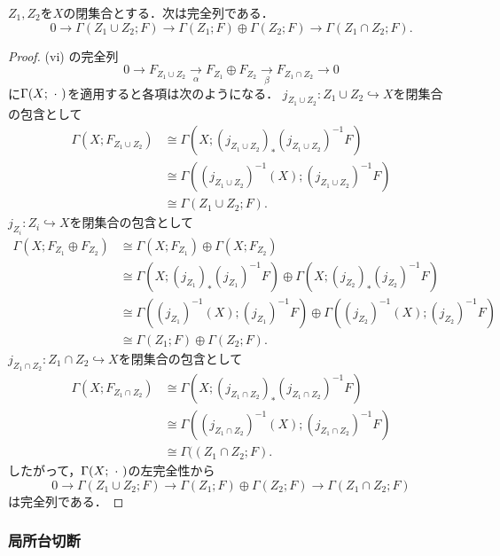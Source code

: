 \begin{leftbar}
\begin{CRL}
    \(Z_1, Z_2\)を\(X\)の閉集合とする．次は完全列である．
    \[
        0\to \Gamma(Z_1\cup Z_2;F)
        \to \Gamma(Z_1;F)\oplus\Gamma(Z_2;F)
        \to \Gamma(Z_1\cap Z_2;F).
    \]
\end{CRL}
\end{leftbar}
\begin{proof}
    (vi) の完全列\[
        0\to F_{Z_1\cup Z_2}\underset{\alpha}{\to}
        F_{Z_1}\oplus F_{Z_2}\underset{\beta}{\to}
        F_{Z_1\cap Z_2}\to0
    \]に\(\Gamma(X;\mathord{\ \cdot\ })\)を適用すると各項は次のようになる．
    \(j_{Z_1\cup Z_2}\colon Z_1\cup Z_2\hookrightarrow X\)を閉集合の包含として
    \begin{align*}
        \Gamma(X;F_{Z_1\cup Z_2})
        &\cong\Gamma(X;(j_{Z_1\cup Z_2})_{\ast}(j_{Z_1\cup Z_2})^{-1}F)\\
        &\cong\Gamma((j_{Z_1\cup Z_2})^{-1}(X);(j_{Z_1\cup Z_2})^{-1}F)\\
        &\cong\Gamma(Z_1\cup Z_2;F).
    \end{align*}
    \(j_{Z_i}\colon Z_i\hookrightarrow X\)を閉集合の包含として
    \begin{align*}
        \Gamma(X;F_{Z_1}\oplus F_{Z_2})
        &\cong\Gamma(X;F_{Z_1})\oplus\Gamma(X;F_{Z_2})\\
        &\cong\Gamma(X;(j_{Z_1})_{\ast}(j_{Z_1})^{-1}F)\oplus\Gamma(X;(j_{Z_2})_{\ast}(j_{Z_2})^{-1}F)\\
        &\cong\Gamma((j_{Z_1})^{-1}(X);(j_{Z_1})^{-1}F)\oplus\Gamma((j_{Z_2})^{-1}(X);(j_{Z_2})^{-1}F)\\
        &\cong\Gamma(Z_1;F)\oplus\Gamma(Z_2;F).
    \end{align*}
    \(j_{Z_1\cap Z_2}\colon Z_1\cap Z_2\hookrightarrow X\)を閉集合の包含として
    \begin{align*}
        \Gamma(X;F_{Z_1\cap Z_2})
        &\cong\Gamma(X;(j_{Z_1\cap Z_2})_{\ast}(j_{Z_1\cap Z_2})^{-1}F)\\
        &\cong\Gamma((j_{Z_1\cap Z_2})^{-1}(X);(j_{Z_1\cap Z_2})^{-1}F)\\
        &\cong\Gamma((Z_1\cap Z_2;F).
    \end{align*}
    したがって，\(\Gamma(X;\mathord{\ \cdot\ })\)の左完全性から\[
        0\to \Gamma(Z_1\cup Z_2;F)
        \to \Gamma(Z_1;F)\oplus\Gamma(Z_2;F)
        \to \Gamma(Z_1\cap Z_2;F)
    \]は完全列である．
\end{proof}

\subsubsection*{局所台切断}

